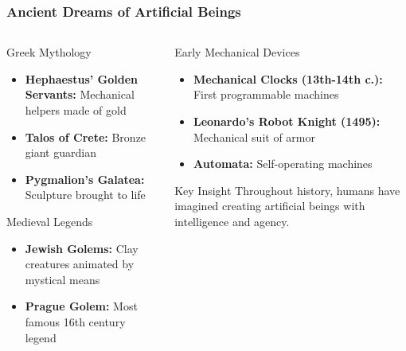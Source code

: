 \documentclass{beamer}
\begin{document}
\begin{frame}
    \frametitle{Ancient Dreams of Artificial Beings}
    \begin{columns}
        \begin{column}{0.48\textwidth}
            \begin{block}{Greek Mythology}
                \begin{itemize}
                    \item \textbf{Hephaestus' Golden Servants:} Mechanical helpers made of gold
                    \item \textbf{Talos of Crete:} Bronze giant guardian 
                    \item \textbf{Pygmalion's Galatea:} Sculpture brought to life
                \end{itemize}
            \end{block}
            
            \begin{block}{Medieval Legends}
                \begin{itemize}
                    \item \textbf{Jewish Golems:} Clay creatures animated by mystical means
                    \item \textbf{Prague Golem:} Most famous 16th century legend
                \end{itemize}
            \end{block}
        \end{column}
        \begin{column}{0.48\textwidth}
            \begin{alertblock}{Early Mechanical Devices}
                \begin{itemize}
                    \item \textbf{Mechanical Clocks (13th-14th c.):} First programmable machines
                    \item \textbf{Leonardo's Robot Knight (1495):} Mechanical suit of armor
                    \item \textbf{Automata:} Self-operating machines
                \end{itemize}
            \end{alertblock}
            
            \begin{exampleblock}{Key Insight}
                Throughout history, humans have imagined creating artificial beings with intelligence and agency.
            \end{exampleblock}
        \end{column}
    \end{columns}
\end{frame}
\end{document}
